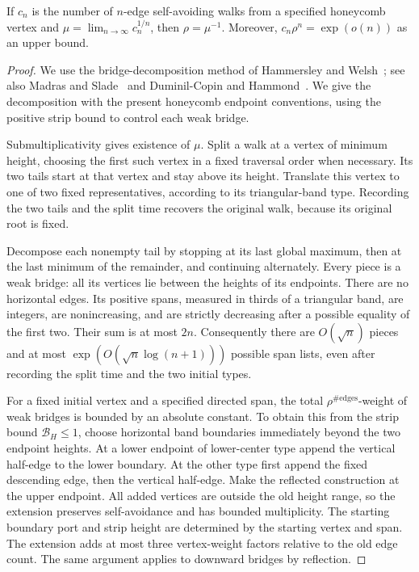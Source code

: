 \begin{proposition}\label{prop:02-critical}
If $c_n$ is the number of $n$-edge self-avoiding walks from a specified
honeycomb vertex and $\mu=\lim_{n\to\infty}c_n^{1/n}$, then
$\rho=\mu^{-1}$. Moreover, $c_n\rho^n=\exp(o(n))$ as an upper bound.
\end{proposition}
\begin{proof}
We use the bridge-decomposition method of Hammersley and
Welsh~\cite{HammersleyWelsh1962}; see also
Madras and Slade~\cite{MadrasSlade1993} and
Duminil-Copin and Hammond~\cite[Proposition~2.1]{DuminilCopinHammond2013}.
We give the decomposition with the present honeycomb endpoint conventions,
using the positive strip bound to control each weak bridge.

Submultiplicativity gives existence of $\mu$. Split a walk at a vertex
of minimum height, choosing the first such vertex in a fixed traversal
order when necessary. Its two tails start at that vertex and stay above
its height. Translate this vertex to one of two fixed representatives,
according to its triangular-band type. Recording the two tails and the
split time recovers the original walk, because its original root is fixed.

Decompose each nonempty tail by stopping at its last global maximum,
then at the last minimum of the remainder, and continuing alternately.
Every piece is a weak bridge: all its vertices lie between the heights
of its endpoints. There are no horizontal edges. Its positive spans,
measured in thirds of a triangular band, are integers, are nonincreasing,
and are strictly decreasing after a possible equality of the first two.
Their sum is at most $2n$. Consequently there are $O(\sqrt n)$ pieces
and at most $\exp(O(\sqrt n\log(n+1)))$ possible span lists, even after
recording the split time and the two initial types.

For a fixed initial vertex and a specified directed span, the total
$\rho^{\#\text{edges}}$-weight of weak bridges is bounded by an absolute
constant. To obtain this from the strip bound $\mathcal B_H\le1$,
choose horizontal band boundaries immediately beyond the two endpoint
heights. At a lower endpoint of lower-center type append the vertical
half-edge to the lower boundary. At the other type first append the
fixed descending edge, then the vertical half-edge. Make the reflected
construction at the upper endpoint. All added vertices are outside the
old height range, so the extension preserves self-avoidance and has
bounded multiplicity. The starting boundary port and strip height are
determined by the starting vertex and span. The extension adds at most
three vertex-weight factors relative to the old edge count. The same
argument applies to downward bridges by reflection.


\end{proof}
